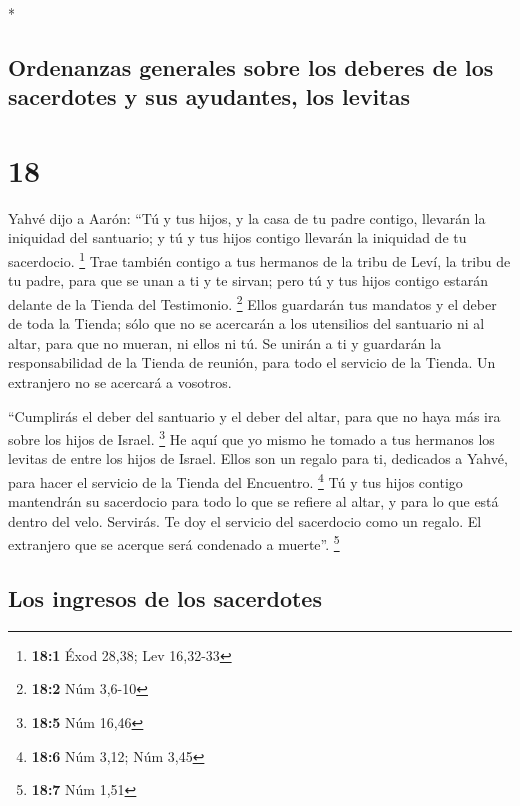 \begin{paracol}{2}
\begin{otherlanguage}{english}
\end{otherlanguage}

\switchcolumn[0]*

\hypertarget{ordenanzas-generales-sobre-los-deberes-de-los-sacerdotes-y-sus-ayudantes-los-levitas}{%
\subsection{Ordenanzas generales sobre los deberes de los sacerdotes y
sus ayudantes, los
levitas}\label{ordenanzas-generales-sobre-los-deberes-de-los-sacerdotes-y-sus-ayudantes-los-levitas}}

\hypertarget{section-34}{%
\section{18}\label{section-34}}

 Yahvé dijo a Aarón: ``Tú y tus hijos, y la casa de tu
padre contigo, llevarán la iniquidad del santuario; y tú y tus hijos
contigo llevarán la iniquidad de tu sacerdocio. \footnote{\textbf{18:1}
  Éxod 28,38; Lev 16,32-33}  Trae también contigo a tus
hermanos de la tribu de Leví, la tribu de tu padre, para que se unan a
ti y te sirvan; pero tú y tus hijos contigo estarán delante de la Tienda
del Testimonio. \footnote{\textbf{18:2} Núm 3,6-10}  Ellos
guardarán tus mandatos y el deber de toda la Tienda; sólo que no se
acercarán a los utensilios del santuario ni al altar, para que no
mueran, ni ellos ni tú.  Se unirán a ti y guardarán la
responsabilidad de la Tienda de reunión, para todo el servicio de la
Tienda. Un extranjero no se acercará a vosotros.

 ``Cumplirás el deber del santuario y el deber del altar,
para que no haya más ira sobre los hijos de Israel. \footnote{\textbf{18:5}
  Núm 16,46}  He aquí que yo mismo he tomado a tus
hermanos los levitas de entre los hijos de Israel. Ellos son un regalo
para ti, dedicados a Yahvé, para hacer el servicio de la Tienda del
Encuentro. \footnote{\textbf{18:6} Núm 3,12; Núm 3,45}  Tú
y tus hijos contigo mantendrán su sacerdocio para todo lo que se refiere
al altar, y para lo que está dentro del velo. Servirás. Te doy el
servicio del sacerdocio como un regalo. El extranjero que se acerque
será condenado a muerte''. \footnote{\textbf{18:7} Núm 1,51}

\hypertarget{los-ingresos-de-los-sacerdotes}{%
\subsection{Los ingresos de los
sacerdotes}\label{los-ingresos-de-los-sacerdotes}}


\end{paracol}
